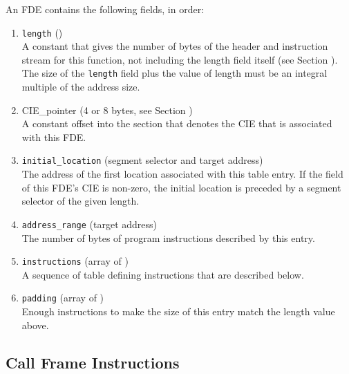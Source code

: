 An FDE contains the following fields, in order:
\begin{enumerate}[1. ]
\item \texttt{length} ()  \\
A constant that gives the number of bytes of the header and
instruction stream for this function, not including the length
field itself 
(see Section ). 
The size of the \texttt{length} field
plus the value of length must be an integral multiple of the
address size.

\item   CIE\_pointer (4 or 8 bytes, see Section ) \\
A constant 
offset into the \dotdebugframe{}
section that denotes
the CIE that is associated with this FDE.

\item  \texttt{initial\_location} (segment selector and target address) \\
The 
address of the first location associated with this table
entry. 
If the  field of this FDE's CIE is non-zero,
the initial location is preceded by a segment selector of
the given length.

\item  \texttt{address\_range} (target address) \\
The 
number 
of bytes of program instructions described by this entry.

\item \texttt{instructions} (array of ) \\
A sequence of table defining instructions that are described below.

\item \texttt{padding} (array of ) \\
Enough \DWCFAnop{} instructions 
to make the size of this entry match the length value above.
\end{enumerate}

\subsection{Call Frame Instructions}
\label{chap:callframeinstructions}

